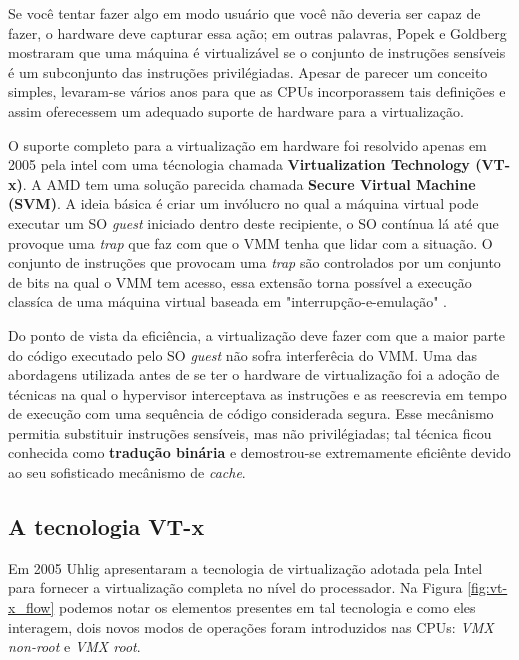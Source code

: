 Se você tentar fazer algo em modo usuário que você não deveria ser capaz de
fazer, o hardware deve capturar essa ação; em outras palavras, Popek e Goldberg
mostraram que uma máquina é virtualizável se o conjunto de instruções sensíveis
é um subconjunto das instruções privilégiadas. Apesar de parecer um conceito
simples, levaram-se vários anos para que as CPUs incorporassem tais definições
e assim oferecessem um adequado suporte de hardware para a virtualização.

O suporte completo para a virtualização em hardware foi resolvido apenas em
2005 pela intel \cite{uhlig} com uma técnologia chamada \textbf{Virtualization
Technology (VT-x)}. A AMD tem uma solução parecida chamada \textbf{Secure
Virtual Machine (SVM)}. A ideia básica é criar um invólucro no qual a máquina
virtual pode executar um SO \emph{guest} iniciado dentro deste recipiente, o SO
contínua lá até que provoque uma \emph{trap} que faz com que o VMM tenha que
lidar com a situação. O conjunto de instruções que provocam uma \emph{trap} são
controlados por um conjunto de bits na qual o VMM tem acesso, essa extensão
torna possível a execução classíca de uma máquina virtual baseada em
"interrupção-e-emulação" \cite{tanenbaum}.

Do ponto de vista da eficiência, a virtualização deve fazer com que a maior
parte do código executado pelo SO \emph{guest} não sofra interferêcia do VMM.
Uma das abordagens utilizada antes de se ter o hardware de virtualização foi a
adoção de técnicas na qual o hypervisor interceptava as instruções e as
reescrevia em tempo de execução com uma sequência de código considerada segura.
Esse mecânismo permitia substituir instruções sensíveis, mas não privilégiadas;
tal técnica ficou conhecida como \textbf{tradução binária} e demostrou-se
extremamente eficiênte devido ao seu sofisticado mecânismo de \emph{cache}.


\subsection{A tecnologia VT-x}

Em 2005 Uhlig \citep{uhlig} apresentaram a tecnologia de virtualização adotada
pela Intel para fornecer a virtualização completa no nível do processador. Na
Figura \ref{fig:vt-x_flow} podemos notar os elementos presentes em tal
tecnologia e como eles interagem, dois novos modos de operações foram
introduzidos nas CPUs: \emph{VMX non-root} e \emph{VMX root}.

